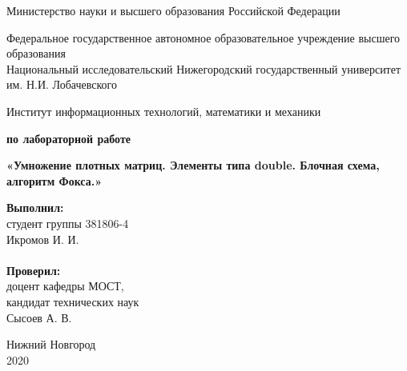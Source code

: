 \documentclass{report}
\begin{document}
\begin{titlepage}

\begin{center}
Министерство науки и высшего образования Российской Федерации
\end{center}

\begin{center}
Федеральное государственное автономное образовательное учреждение высшего образования \\
Национальный исследовательский Нижегородский государственный университет им. Н.И. Лобачевского
\end{center}

\begin{center}
Институт информационных технологий, математики и механики
\end{center}

\vspace{4em}

\begin{center}
\textbf{ по лабораторной работе} \\
\end{center}
\begin{center}
\textbf{\Large«Умножение плотных матриц. Элементы типа double. Блочная схема, алгоритм Фокса.»} \\
\end{center}

\vspace{4em}

\newbox{\lbox}
\newlength{\maxl}
\setlength{\maxl}{\wd\lbox}
\hfill\parbox{7cm}{
\hspace*{5cm}\hspace*{-5cm}\textbf{Выполнил:} \\ студент группы 381806-4 \\ Икромов И. И.\\
\\
\hspace*{5cm}\hspace*{-5cm}\textbf{Проверил:}\\ доцент кафедры МОСТ, \\ кандидат технических наук \\ Сысоев А. В.\\
}
\vspace{\fill}

\begin{center} Нижний Новгород \\ 2020 \end{center}

\end{titlepage}
\end{document}
